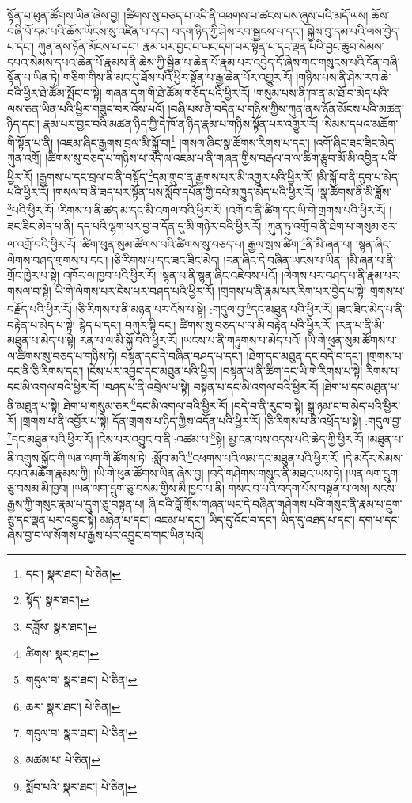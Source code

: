 སྟོན་པ་ཕུན་ཚོགས་ཡིན་ཞེས་བྱ། །ཚིགས་སུ་བཅད་པ་འདི་ནི་འཕགས་པ་ཚངས་པས་ཞུས་པའི་མདོ་ལས། ཆོས་བཞི་པོ་དམ་པའི་ཆོས་ཡོངས་སུ་འཛིན་པ་དང་། བདག་ཉིད་ཀྱི་ཤེས་རབ་སྦྱངས་པ་དང་། སྐྱེས་བུ་དམ་པའི་ལས་བྱེད་པ་དང་། ཀུན་ནས་ཉོན་མོངས་པ་དང་། རྣམ་པར་བྱང་བ་ཡང་དག་པར་སྟོན་པ་དང་ལྡན་པའི་བྱང་ཆུབ་སེམས་དཔའ་སེམས་དཔའ་ཆེན་པོ་རྣམས་ནི་ཆེས་ཀྱི་སྦྱིན་པ་ཆེན་པོ་རྣམ་པར་འབྱེད་དོ་ཞེས་གང་གསུངས་པའི་དོན་བཞི་སྟོན་པ་ཡིན་ཏེ། གཅིག་གིས་ནི་མང་དུ་ཐོས་པའི་ཕྱིར་སྟོན་པ་རྒྱ་ཆེན་པོར་འགྱུར་རོ། །གཉིས་པས་ནི་ཤེས་རབ་ཆེ་བའི་ཕྱིར་ཐེ་ཚོམ་སྤོང་བ་སྟེ། གཞན་དག་གི་ཐེ་ཚོམ་གཅོད་པའི་ཕྱིར་རོ། །གསུམ་པས་ནི་ཁ་ན་མ་ཐོ་བ་མེད་པའི་ལས་ཅན་ཡིན་པའི་ཕྱིར་གཟུང་བར་འོས་པའོ། །བཞི་པས་ནི་བདེན་པ་གཉིས་ཀྱིས་ཀུན་ནས་ཉོན་མོངས་པའི་མཚན་ཉིད་དང་། རྣམ་པར་བྱང་བའི་མཚན་ཉིད་ཀྱི་དེ་ཁོ་ན་ཉིད་རྣམ་པ་གཉིས་སྟོན་པར་འགྱུར་རོ། །སེམས་དཔའ་མཆོག་གི་སྟོན་པ་ནི། །འཇམ་ཞིང་རྒྱགས་བྲལ་མི་སྐྱོ་བ།\footnote{དང་།  སྣར་ཐང་།  པེ་ཅིན། } །གསལ་ཞིང་སྣ་ཚོགས་རིགས་པ་དང་། །འགོ་ཞིང་ཟང་ཟིང་མེད་ཀུན་འགྲོ། །ཚིགས་སུ་བཅད་པ་གཉིས་པ་འདི་ལ་འཇམ་པ་ནི་གཞན་གྱིས་བརྒལ་བ་ལ་ཚིག་རྩུབ་མོ་མི་འབྱིན་པའི་ཕྱིར་རོ། །རྒྱགས་པ་དང་བྲལ་བ་ནི་བསྟོད་\footnote{སྟོད་  སྣར་ཐང་། }དམ་གྲུབ་ན་རྒྱགས་པར་མི་འགྱུར་པའི་ཕྱིར་རོ། །མི་སྐྱོ་བ་ནི་དུབ་པ་མེད་པའི་ཕྱིར་རོ། །གསལ་བ་ནི་ཟད་པར་སྟོན་པས་སློབ་དཔོན་གྱི་དཔེ་མཁྱུད་མེད་པའི་ཕྱིར་རོ། །སྣ་ཚོགས་ནི་མི་ཟློས་\footnote{བཟློས་  སྣར་ཐང་། }པའི་ཕྱིར་རོ། །རིགས་པ་ནི་ཚད་མ་དང་མི་འགལ་བའི་ཕྱིར་རོ། །འགོ་བ་ནི་ཚིག་དང་ཡི་གེ་གྲགས་པའི་ཕྱིར་རོ། །ཟང་ཟིང་མེད་པ་ནི། དད་པའི་ལྷག་པར་བྱ་བ་དོན་དུ་མི་གཉེར་བའི་ཕྱིར་རོ། །ཀུན་ཏུ་འགྲོ་བ་ནི་ཐེག་པ་གསུམ་ཅར་ལ་འགྲོ་བའི་ཕྱིར་རོ། །ཚིག་ཕུན་སུམ་ཚོགས་པའི་ཚིགས་སུ་བཅད་པ། རྒྱལ་སྲས་ཚིག་\footnote{ཚིགས་  སྣར་ཐང་། }ནི་མི་ཞན་པ། །སྙན་ཞིང་ལེགས་བཤད་གྲགས་པ་དང་། །ཅི་རིགས་པ་དང་ཟང་ཟིང་མེད། །རན་ཞིང་དེ་བཞིན་ཡངས་པ་ཡིན། །མི་ཞན་པ་ནི་གྲོང་ཁྱེར་པ་སྟེ། འཁོར་ལ་ཁྱབ་པའི་ཕྱིར་རོ། །སྙན་པ་ནི་སྙན་ཞིང་འཇེབས་པའོ། །ལེགས་པར་བཤད་པ་ནི་རྣམ་པར་གསལ་བ་སྟེ། ཡི་གེ་ལེགས་པར་ངེས་པར་བཤད་པའི་ཕྱིར་རོ། །གྲགས་པ་ནི་རྣམ་པར་རིག་པར་བྱེད་པ་སྟེ། གྲགས་པ་བརྗོད་པའི་ཕྱིར་རོ། །ཅི་རིགས་པ་ནི་མཉན་པར་འོས་པ་སྟེ། :གདུལ་བྱ་\footnote{གདུལ་བ་  སྣར་ཐང་།  པེ་ཅིན། }དང་མཐུན་པའི་ཕྱིར་རོ། །ཟང་ཟིང་མེད་པ་ནི་བརྟེན་པ་མེད་པ་སྟེ། རྙེད་པ་དང་། བཀུར་སྟི་དང་། ཚིགས་སུ་བཅད་པ་ལ་མི་བརྟེན་པའི་ཕྱིར་རོ། །རན་པ་ནི་མི་མཐུན་པ་མེད་པ་སྟེ། རན་པ་ལ་མི་སྐྱོ་བའི་ཕྱིར་རོ། །ཡངས་པ་ནི་གཏུགས་པ་མེད་པའོ། །ཡི་གེ་ཕུན་སུམ་ཚོགས་པ་ལ་ཚིགས་སུ་བཅད་པ་གཉིས་ཏེ། བསྟན་དང་དེ་བཞིན་བཤད་པ་དང་། །ཐེག་དང་མཐུན་དང་བདེ་བ་དང་། །གྲགས་པ་དང་ནི་ཅི་རིགས་དང་། །ངེས་པར་འབྱུང་དང་མཐུན་པའི་ཕྱིར། །བསྟན་པ་ནི་ཚིག་དང་ཡི་གེ་རིགས་པ་སྟེ། རིགས་པ་དང་མི་འགལ་བའི་ཕྱིར་རོ། །བཤད་པ་ནི་འབྲེལ་པ་སྟེ། བསྟན་པ་དང་མི་འགལ་བའི་ཕྱིར་རོ། །ཐེག་པ་དང་མཐུན་པ་ནི་མཐུན་པ་སྟེ། ཐེག་པ་གསུམ་ཅར་\footnote{ཆར་  སྣར་ཐང་།  པེ་ཅིན། }དང་མི་འགལ་བའི་ཕྱིར་རོ། །བདེ་བ་ནི་རུང་བ་སྟེ། སྒྲ་ཉམ་ང་བ་མེད་པའི་ཕྱིར་རོ། །གྲགས་པ་ནི་འབྱོར་པ་སྟེ། དོན་གྲགས་པ་ཉིད་ཀྱིས་འདོན་པའི་ཕྱིར་རོ། །ཅི་རིགས་པ་ནི་འཕྲོད་པ་སྟེ། :གདུལ་བྱ་\footnote{གདུལ་བ་  སྣར་ཐང་།  པེ་ཅིན། }དང་མཐུན་པའི་ཕྱིར་རོ། །ངེས་པར་འབྱུང་བ་ནི་:འཚམ་པ་\footnote{མཚམ་པ་  པེ་ཅིན། }སྟེ། མྱ་ངན་ལས་འདས་པའི་ཆེད་ཀྱི་ཕྱིར་རོ། །མཐུན་པ་ནི་འགྲུས་སྐྱོང་གི་ཡན་ལག་གི་ཚོགས་ཏེ། :སློབ་མའི་\footnote{སློབ་པའི་  སྣར་ཐང་།  པེ་ཅིན། }འཕགས་པའི་ལམ་དང་མཐུན་པའི་ཕྱིར་རོ། །དེ་མདོར་སེམས་དཔའ་མཆོག་རྣམས་ཀྱི། །ཡི་གེ་ཕུན་ཚོགས་ཡིན་ཞེས་བྱ། །བདེ་གཤེགས་གསུང་ནི་མཐའ་ཡས་ཏེ། །ཡན་ལག་དྲུག་ཅུ་བསམ་མི་ཁྱབ། །ཡན་ལག་དྲུག་ཅུ་བསམ་གྱིས་མི་ཁྱབ་པ་ནི། གསང་བ་པའི་བདག་པོས་བསྟན་པ་ལས། སངས་རྒྱས་ཀྱི་གསུང་རྣམ་པ་དྲུག་ཅུ་བསྟན་པ། ཞི་བའི་བློ་གྲོས་གཞན་ཡང་དེ་བཞིན་གཤེགས་པའི་གསུང་ནི་རྣམ་པ་དྲུག་ཅུ་དང་ལྡན་པར་འབྱུང་སྟེ། མཉེན་པ་དང་། འཇམ་པ་དང་། ཡིད་དུ་འོང་བ་དང་། ཡིད་དུ་འཐད་པ་དང་། དག་པ་དང་ཞེས་བྱ་བ་ལ་སོགས་པ་རྒྱས་པར་འབྱུང་བ་གང་ཡིན་པའོ། 